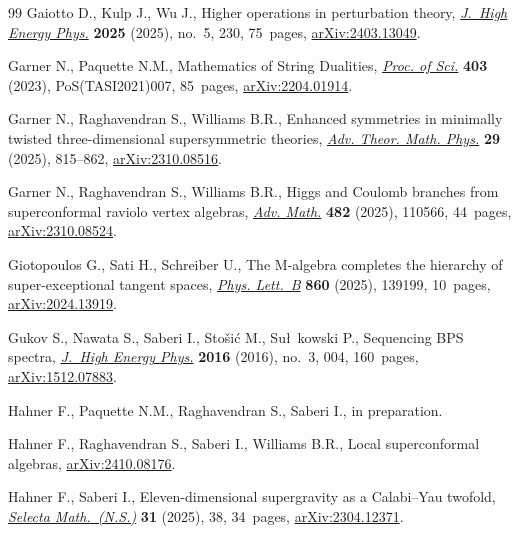 \begin{thebibliography}{99}
Gaiotto D., Kulp J., Wu J., Higher operations in perturbation theory,
 \href{https://doi.org/10.1007/jhep05(2025)230}{\textit{J.~High Energy Phys.}}
 \textbf{2025} (2025), no.~5, 230, 75~pages,
 \href{http://arxiv.org/abs/2403.13049}{arXiv:2403.13049}.

Garner N., Paquette N.M., Mathematics of String Dualities,
 \href{https://doi.org/10.22323/1.403.0007}{\textit{Proc. of Sci.}}
 \textbf{403} (2023), PoS(TASI2021)007, 85~pages,
 \href{http://arxiv.org/abs/2204.01914}{arXiv:2204.01914}.

Garner N., Raghavendran S., Williams B.R., Enhanced symmetries in minimally
 twisted three-dimensional supersymmetric theories,
 \href{https://doi.org/10.4310/atmp.250929221027}{\textit{Adv. Theor. Math.
 Phys.}} \textbf{29} (2025), 815--862,
 \href{http://arxiv.org/abs/2310.08516}{arXiv:2310.08516}.

Garner N., Raghavendran S., Williams B.R., Higgs and {C}oulomb branches from
 superconformal raviolo vertex algebras,
 \href{https://doi.org/10.1016/j.aim.2025.110566}{\textit{Adv. Math.}}
 \textbf{482} (2025), 110566, 44~pages,
 \href{http://arxiv.org/abs/2310.08524}{arXiv:2310.08524}.

Giotopoulos G., Sati H., Schreiber U., The {M}-algebra completes the hierarchy
 of super-exceptional tangent spaces,
 \href{https://doi.org/10.1016/j.physletb.2024.139199}{\textit{Phys. Lett.~B}}
 \textbf{860} (2025), 139199, 10~pages,
 \href{http://arxiv.org/abs/2024.13919}{arXiv:2024.13919}.

Gukov S., Nawata S., Saberi I., Sto\v{s}i\'c M., Su\l~kowski P., Sequencing
 {BPS} spectra, \href{https://doi.org/10.1007/JHEP03(2016)004}{\textit{J.~High
 Energy Phys.}} \textbf{2016} (2016), no.~3, 004, 160~pages,
 \href{http://arxiv.org/abs/1512.07883}{arXiv:1512.07883}.

Hahner F., Paquette N.M., Raghavendran S., Saberi I., {i}n
 preparation.

Hahner F., Raghavendran S., Saberi I., Williams B.R., Local superconformal
 algebras, \href{http://arxiv.org/abs/2410.08176}{arXiv:2410.08176}.

Hahner F., Saberi I., Eleven-dimensional supergravity as a {C}alabi--{Y}au
 twofold, \href{https://doi.org/10.1007/s00029-025-01024-x}{\textit{Selecta
 Math.~(N.S.)}} \textbf{31} (2025), 38, 34~pages,
 \href{http://arxiv.org/abs/2304.12371}{arXiv:2304.12371}.


\end{thebibliography}
